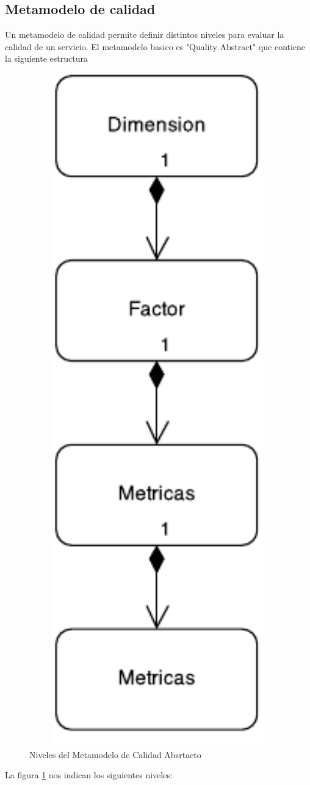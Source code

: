 \documentclass[a4paper,openright,12pt]{report}
\begin{document}
\subsection{Metamodelo de calidad}
Un metamodelo de calidad permite definir distintos niveles para evaluar la calidad de un servicio. El metamodelo basico es "Quality Abstract" que contiene la siguiente estructura
\begin{figure} [h]
\centering
\includegraphics[width=1\textwidth]{images/pdf/metamodelo_de_calidad.pdf}
	\caption{Niveles del Metamodelo de Calidad Absrtacto}
  	\label{figura:metamodelo_de_calidad}
\end{figure}

La figura \ref{figura:metamodelo_de_calidad} nos indican los siguientes niveles:




\end{document}
